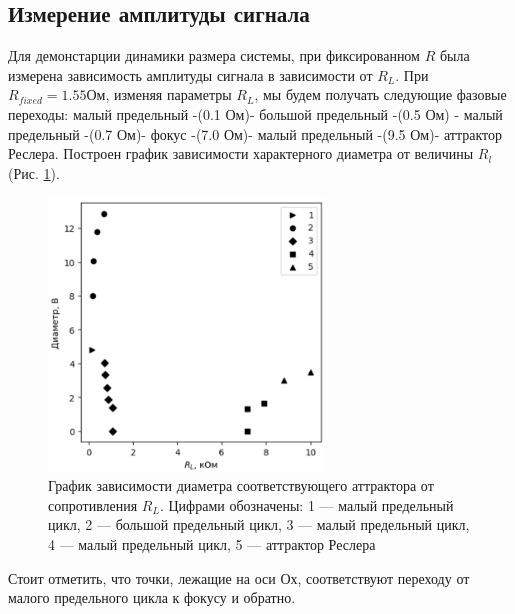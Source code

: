 \documentclass[12pt]{article}
\begin{document}
\subsection*{Измерение амплитуды сигнала }
Для демонстарции динамики размера системы, при фиксированном $R$ была измерена зависимость
амплитуды сигнала в зависимости от $R_L$.
При $R_{fixed} = 1.55 \text{Ом}$, изменяя параметры $R_L$, мы будем получать следующие фазовые переходы: малый предельный -(0.1 Ом)- большой предельный -(0.5 Ом) - малый предельный -(0.7 Ом)- фокус -(7.0 Ом)- малый предельный -(9.5 Ом)- аттрактор Реслера.
Построен график зависимости характерного диаметра от величины $R_l$ (Рис. \ref{fig:amplitudes_fix_R}).
\begin{figure}[H]
	\centering
	\includegraphics[width=0.65\textwidth]{diam(rl).png}
	\caption{График зависимости диаметра соответствующего аттрактора от сопротивления $R_L$. 
	Цифрами обозначены: 1 --- малый предельный цикл, 2 --- большой предельный цикл, 3 --- малый предельный цикл, 4 --- малый предельный цикл, 5 --- аттрактор Реслера}
	\label{fig:amplitudes_fix_R}
\end{figure}

Стоит отметить, что точки, лежащие на оси Ох, 
соответствуют переходу от малого предельного цикла к фокусу и обратно. 


\end{document}
